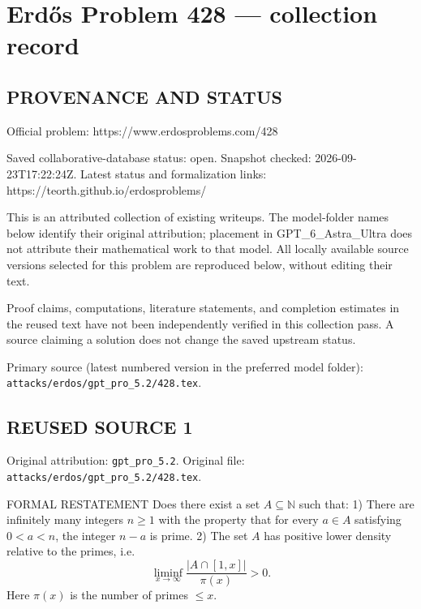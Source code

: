 \section*{Erd\H{o}s Problem 428 --- collection record}

\subsection*{PROVENANCE AND STATUS}
Official problem: https://www.erdosproblems.com/428

Saved collaborative-database status: open.
Snapshot checked: 2026-09-23T17:22:24Z.
Latest status and formalization links: https://teorth.github.io/erdosproblems/

This is an attributed collection of existing writeups. The model-folder names below identify their original attribution; placement in GPT\_6\_Astra\_Ultra does not attribute their mathematical work to that model. All locally available source versions selected for this problem are reproduced below, without editing their text.

Proof claims, computations, literature statements, and completion estimates in the reused text have not been independently verified in this collection pass. A source claiming a solution does not change the saved upstream status.

Primary source (latest numbered version in the preferred model folder): \texttt{attacks/erdos/gpt\_pro\_5.2/428.tex}.

\subsection*{REUSED SOURCE 1}
Original attribution: \texttt{gpt\_pro\_5.2}.
Original file: \texttt{attacks/erdos/gpt\_pro\_5.2/428.tex}.


FORMAL RESTATEMENT
Does there exist a set $A\subseteq\mathbb N$ such that:
1) There are infinitely many integers $n\ge 1$ with the property that for every $a\in A$ satisfying $0<a<n$, the integer $n-a$ is prime.
2) The set $A$ has positive lower density relative to the primes, i.e.
\[
\liminf_{x\to\infty}\frac{|A\cap[1,x]|}{\pi(x)}>0.
\]
Here $\pi(x)$ is the number of primes $\le x$.

